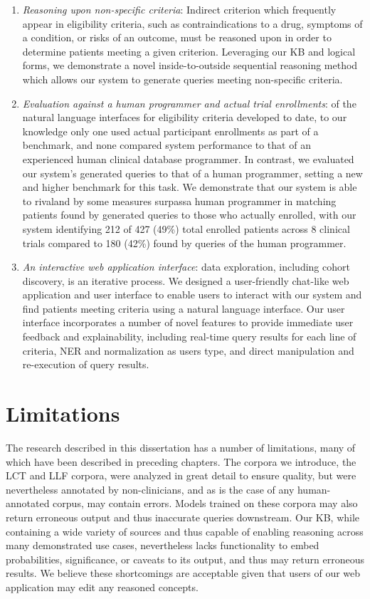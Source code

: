 \documentclass[../main.tex]{subfiles}
\begin{document}
\begin{enumerate}
    \item \textit{Reasoning upon non-specific criteria}: Indirect criterion which frequently appear in eligibility criteria, such as contraindications to a drug, symptoms of a condition, or risks of an outcome, must be reasoned upon in order to determine patients meeting a given criterion. Leveraging our KB and logical forms, we demonstrate a novel inside-to-outside sequential reasoning method which allows our system to generate queries meeting non-specific criteria.
    \item \textit{Evaluation against a human programmer and actual trial enrollments}: of the natural language interfaces for eligibility criteria developed to date, to our knowledge only one used actual participant enrollments as part of a benchmark, and none compared system performance to that of an experienced human clinical database programmer. In contrast, we evaluated our system's generated queries to that of a human programmer, setting a new and higher benchmark for this task. We demonstrate that our system is able to rival\textemdash and by some measures surpass\textemdash a human programmer in matching patients found by generated queries to those who actually enrolled, with our system identifying 212 of 427 (49\%) total enrolled patients across 8 clinical trials compared to 180 (42\%) found by queries of the human programmer.
    \item \textit{An interactive web application interface}: data exploration, including cohort discovery, is an iterative process. We designed a user-friendly chat-like web application and user interface to enable users to interact with our system and find patients meeting criteria using a natural language interface. Our user interface incorporates a number of novel features to provide immediate user feedback and explainability, including real-time query results for each line of criteria, NER and normalization as users type, and direct manipulation and re-execution of query results.
\end{enumerate}

\section{Limitations}

The research described in this dissertation has a number of limitations, many of which have been described in preceding chapters. The corpora we introduce, the LCT and LLF corpora, were analyzed in great detail to ensure quality, but were nevertheless annotated by non-clinicians, and as is the case of any human-annotated corpus, may contain errors. Models trained on these corpora may also return erroneous output and thus inaccurate queries downstream. Our KB, while containing a wide variety of sources and thus capable of enabling reasoning across many demonstrated use cases, nevertheless lacks functionality to embed probabilities, significance, or caveats to its output, and thus may return erroneous results. We believe these shortcomings are acceptable given that users of our web application may edit any reasoned concepts. 
\end{document}

